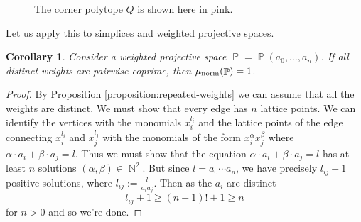 \documentclass[a4paper,11pt]{amsart}
\theoremstyle{plain}
\newtheorem{corollary}[theorem]{Corollary}
\theoremstyle{definition}
\theoremstyle{remark}
\DeclareMathOperator{\NN}{\mathbb{N}}
\DeclareMathOperator{\PP}{\mathbb{P}}
\DeclareMathOperator{\munorm}{\mu_{\text norm}}
\begin{document}
\begin{figure}[!hbt]
\begin{center}
\end{center}
\caption{The corner polytope $Q$ is shown here in pink.}
\end{figure}  


Let us apply this to simplices and weighted projective spaces.

\begin{corollary}\label{corollary:distinct-weights}
Consider a weighted projective space $\PP = \PP(a_0, \dots , a_n)$.
If all distinct weights are pairwise coprime, then $\munorm(\PP) = 1$.
\end{corollary}

\begin{proof}
By Proposition \ref{proposition:repeated-weights} we can assume that all the weights are distinct.
We must show that every edge has $n$ lattice points.
We can identify the vertices with the monomials $x_i^{l_i}$ and the lattice points of the edge connecting $x_i^{l_i}$ and $x_j^{l_j}$ with the monomials of the form $x_i^\alpha x_j^\beta$ where $\alpha \cdot a_i + \beta \cdot a_j = l$.
Thus we must show that the equation $\alpha \cdot a_i + \beta \cdot a_j = l$ has at least $n$ solutions $(\alpha,\beta) \in \NN^2$.
But since $l = a_0 \cdots a_n$, we have precisely $l_{ij}+1$ positive solutions, where $l_{ij}:=\frac{l}{a_ia_j}$.
Then as the $a_i$ are distinct
\[l_{ij}+1 \geq (n-1)! + 1 \geq n\]
for $n>0$ and so we're done.
\end{proof}
\end{document}
